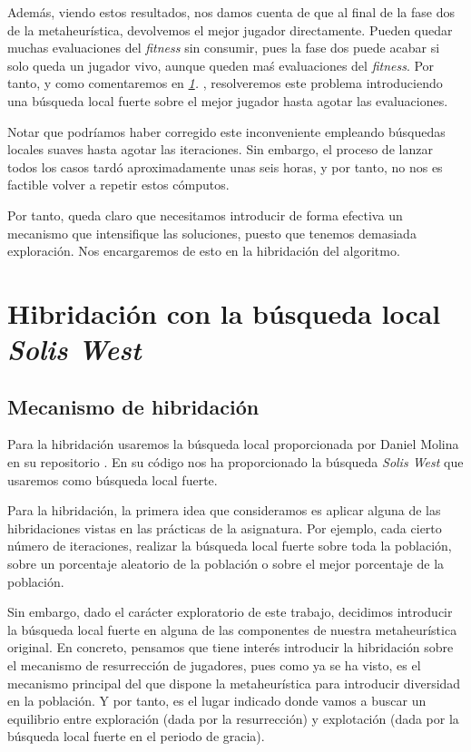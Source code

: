 \documentclass[11pt]{article}
\begin{document}
Además, viendo estos resultados, nos damos cuenta de que al final de la fase dos de la metaheurística, devolvemos el mejor jugador directamente. Pueden quedar muchas evaluaciones del \emph{fitness} sin consumir, pues la fase dos puede acabar si solo queda un jugador vivo, aunque queden maś evaluaciones del \emph{fitness}. Por tanto, y como comentaremos en \emph{\ref{hibridacion}. }, resolveremos este problema introduciendo una búsqueda local fuerte sobre el mejor jugador hasta agotar las evaluaciones.

Notar que podríamos haber corregido este inconveniente empleando búsquedas locales suaves hasta agotar las iteraciones. Sin embargo, el proceso de lanzar todos los casos tardó aproximadamente unas seis horas, y por tanto, no nos es factible volver a repetir estos cómputos.

Por tanto, queda claro que necesitamos introducir de forma efectiva un mecanismo que intensifique las soluciones, puesto que tenemos demasiada exploración. Nos encargaremos de esto en la hibridación del algoritmo.

\pagebreak
\section{Hibridación con la búsqueda local \emph{Solis West}} \label{hibridacion}

\subsection{Mecanismo de hibridación}

Para la hibridación usaremos la búsqueda local proporcionada por Daniel Molina en su repositorio \cite{daniel_repo:online}. En su código nos ha proporcionado la búsqueda \emph{Solis West} que usaremos como búsqueda local fuerte.

Para la hibridación, la primera idea que consideramos es aplicar alguna de las hibridaciones vistas en las prácticas de la asignatura. Por ejemplo, cada cierto número de iteraciones, realizar la búsqueda local fuerte sobre toda la población, sobre un porcentaje aleatorio de la población o sobre el mejor porcentaje de la población.

Sin embargo, dado el carácter exploratorio de este trabajo, decidimos introducir la búsqueda local fuerte en alguna de las componentes de nuestra metaheurística original. En concreto, pensamos que tiene interés introducir la hibridación sobre el mecanismo de resurrección de jugadores, pues como ya se ha visto, es el mecanismo principal del que dispone la metaheurística para introducir diversidad en la población. Y por tanto, es el lugar indicado donde vamos a buscar un equilibrio entre exploración (dada por la resurrección) y explotación (dada por la búsqueda local fuerte en el periodo de gracia).
\end{document}
